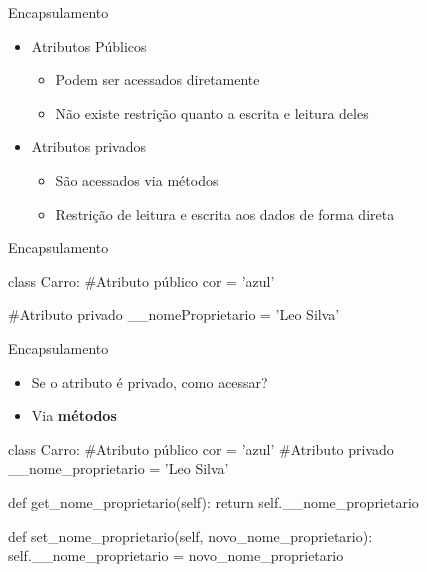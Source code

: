 \documentclass{beamer}
\begin{document}
\begin{frame}{Encapsulamento}
    \begin{itemize}
        \item Atributos Públicos
        \begin{itemize}
            \item Podem ser acessados diretamente
            \item Não existe restrição quanto a escrita e leitura deles
        \end{itemize}
        \item Atributos privados
        \begin{itemize}
            \item São acessados via métodos
            \item Restrição de leitura e escrita aos dados de forma direta
        \end{itemize}
    \end{itemize}
\end{frame}

\begin{frame}[fragile]{Encapsulamento}
    \small
    \begin{semiverbatim}
    class Carro:
        #Atributo público
        cor = 'azul'

        #Atributo privado
        \_\_nomeProprietario = 'Leo Silva'
    \end{semiverbatim}
\end{frame}

\begin{frame}[fragile]{Encapsulamento}
    \begin{itemize}
        \item Se o atributo é privado, como acessar?
        \item Via \textbf{métodos}
    \end{itemize}
    \small
    \begin{semiverbatim}
    class Carro:
        #Atributo público
        cor = 'azul'
        #Atributo privado
        __nome_proprietario = 'Leo Silva'
        
        def get_nome_proprietario(self):
            return self.__nome_proprietario
        
        def set_nome_proprietario(self, novo_nome_proprietario):
            self.__nome_proprietario = novo_nome_proprietario
    \end{semiverbatim}
\end{frame}
\end{document}
